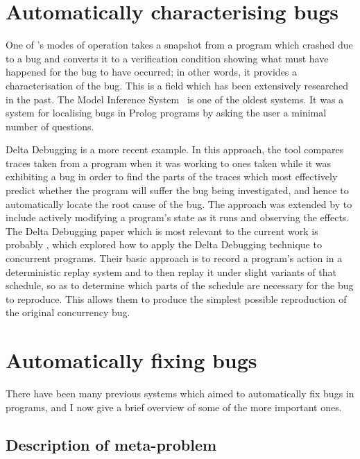 
\section{Automatically characterising bugs}

One of {\implementation}'s modes of operation takes a snapshot from a
program which crashed due to a bug and converts it to a verification
condition showing what must have happened for the bug to have
occurred; in other words, it provides a characterisation of the bug.
This is a field which has been extensively researched in the past.
The Model Inference System~\cite{Shapiro1982} is one of the oldest
systems.  It was a system for localising bugs in Prolog programs by
asking the user a minimal number of questions.

Delta Debugging\cite{Cleve2005} is a more recent example.  In this
approach, the tool compares traces taken from a program when it was
working to ones taken while it was exhibiting a bug in order to find
the parts of the traces which most effectively predict whether the
program will suffer the bug being investigated, and hence to
automatically locate the root cause of the bug.  The approach was
extended by \cite{Jeffrey2009} to include actively
modifying a program's state as it runs and observing the effects.  The
Delta Debugging paper which is most relevant to the current work is
probably \cite{Choi2002}, which explored how to apply the Delta
Debugging technique to concurrent programs.  Their basic approach is
to record a program's action in a deterministic replay system and to
then replay it under slight variants of that schedule, so as to
determine which parts of the schedule are necessary for the bug to
reproduce.  This allows them to produce the simplest possible
reproduction of the original concurrency bug.  

\section{Automatically fixing bugs}


There have been many previous systems which aimed to automatically fix
bugs in programs, and I now give a brief overview of some of the more
important ones.

\subsection{Description of meta-problem}

